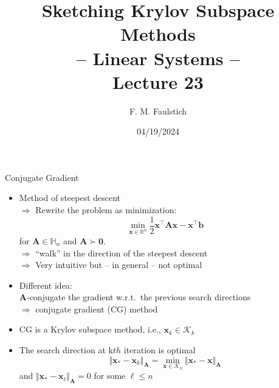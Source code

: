 \documentclass{beamer}
\title{
Sketching Krylov Subspace Methods\\ -- Linear Systems -- \\
Lecture 23
}
\author{F. M. Faulstich}
\date{04/19/2024}
\newcommand{\bgk}[1]{\boldsymbol{#1}}
\newcommand{\bzero}{\bgk{0}}
\newcommand{\bvec}[1]{\mathbf{#1}}
\newcommand{\vb}{\bvec{b}}
\newcommand{\vx}{\bvec{x}}
\newcommand{\vA}{\bvec{A}}
\newcommand{\bitem}{\item[$\bullet$]}
\begin{document}
\frame{\titlepage}


\begin{frame}{Conjugate Gradient}

\begin{itemize}
    \bitem Method of steepest descent\\
    \pause
    $\Rightarrow$ Rewrite the problem as minimization:
    $$
    \min_{\vx \in \mathbb{R}^n} \frac{1}{2}\vx^\top \vA \vx - \vx^\top \vb
    $$
    for $\vA \in \mathbb{H}_n$ and $\vA \succ \bzero$.\\
    \pause
    $\Rightarrow$ ``walk'' in the direction of the steepest descent\\
    $\Rightarrow$ Very intuitive but -- in general -- not optimal
    \pause
    \bitem Different idea:\\
    \pause
    $\vA$-conjugate the gradient w.r.t.~the previous search directions\\
    $\Rightarrow$ conjugate gradient (CG) method
    \pause
    \bitem CG is a Krylov subspace method, i.e., $\vx_k \in \mathcal{K}_k$
    \bitem The search direction at k$th$ iteration is optimal
    $$
    \Vert \vx_* - \vx_k \Vert_{\vA} = \min_{\vx \in \mathcal{K}_k} \Vert \vx_* - \vx \Vert_{\vA}
    $$
    and $\Vert \vx_* - \vx_\ell\Vert_{\vA} = 0 $ for some $\ell \leq n$
\end{itemize}
    
\end{frame}
\end{document}
